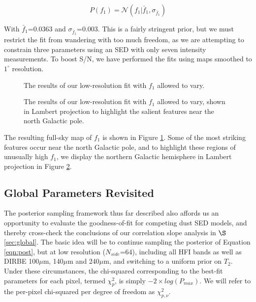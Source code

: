 \documentclass{emulateapj}
\begin{document}
\begin{equation} \label{equ:f1prior}
P(f_1) = \mathcal{N}(f_1|\bar{f}_1, \sigma_{\bar{f}_1})
\end{equation}

With $\bar{f}_1$=0.0363 and $\sigma_{\bar{f}_1}$=0.003. This is a fairly
stringent prior, but we must restrict the fit from wandering with too much
freedom, as we are attempting to constrain three parameters using an SED
with only seven intensity measurements. To boost S/N, we have performed
the fits using maps smoothed to $1^{\circ}$ resolution.

\begin{figure}
\begin{center}
\caption{\label{fig:f1} The results of our low-resolution fit with $f_1$
allowed to vary.}
\end{center}
\end{figure}

\begin{figure}
\begin{center}
\caption{\label{fig:f1lambert} The results of our low-resolution fit with $f_1$
allowed to vary, shown in Lambert projection to highlight the salient features 
near the north Galactic pole.}
\end{center}
\end{figure}

The resulting full-sky map of $f_1$ is shown in Figure \ref{fig:f1}. Some of 
the most striking features occur near the north Galactic pole, and to 
highlight these regions of unusually high $f_1$, we display the northern
Galactic hemisphere in Lambert projection in Figure \ref{fig:f1lambert}.
 

\subsection{Global Parameters Revisited}
\label{sec:hier}

The posterior sampling framework thus far described also affords us an
opportunity to evaluate the goodness-of-fit for competing dust SED models, and 
thereby cross-check the conclusions of our correlation slope analysis in
$\S$\ref{sec:global}. The basic idea will be to continue sampling the posterior
of Equation \ref{eqn:post}, but at low resolution ($N_{side}$=64), including 
all HFI bands as well as DIRBE 100$\mu$m, 140$\mu$m and 240$\mu$m, and 
switching to a uniform prior on $T_2$. Under these circumstances, the 
chi-squared corresponding to the best-fit parameters for each pixel, termed 
$\chi^2_p$, is simply $-2 \times log(P_{max})$. We will refer to the
per-pixel chi-squared per degree of freedom as $\chi^2_{p, \nu}$.
\end{document}
